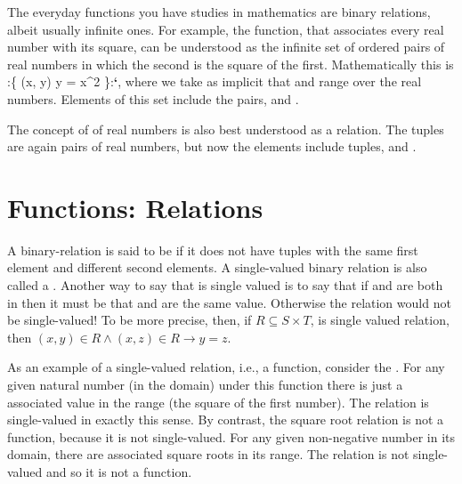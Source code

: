 \documentclass[letterpaper,10pt,english]{sphinxmanual}
\begin{document}
The everyday functions you have studies in mathematics are binary
relations, albeit usually infinite ones. For example, the 
function, that associates every real number with its square, can be
understood as the infinite set of ordered pairs of real numbers in
which the second is the square of the first. Mathematically this is
:\{ (x, y) \textbar{} y = x\textasciicircum{}2 \}:{\color{red}\bfseries{}{}`}, where we take as implicit that  and 
range over the real numbers. Elements of this set include the pairs,
 and .

The concept of  of real numbers is also best understood
as a relation. The tuples are again pairs of real numbers, but now the
elements include tuples,  and .


\section{Functions:  Relations}
\label{\detokenize{07-set-theory:functions-single-valued-relations}}
A binary-relation is said to be  if it does not have
tuples with the same first element and different second elements.  A
single-valued binary relation is also called a .  Another
way to say that  is single valued is to say that if  and
 are both in  then it must be that  and  are the same
value. Otherwise the relation would not be single-valued! To be more
precise, then, if \(R \subseteq S \times T\), is single valued
relation, then \((x, y) \in R \land (x, z) \in R \rightarrow y =
z\).

As an example of a single-valued relation, i.e., a function, consider
the . For any given natural number (in the domain) under this
function there is just a  associated value in the range (the
square of the first number). The relation is single-valued in exactly
this sense. By contrast, the square root relation is not a function,
because it is not single-valued. For any given non-negative number in
its domain, there are  associated square roots in its range. The
relation is not single-valued and so it is not a function.
\end{document}
